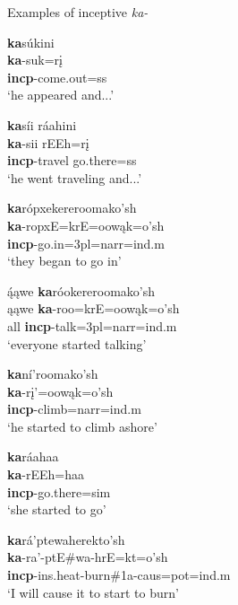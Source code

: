 \begin{exe}
\item\label{inceptiveexamples} Examples of inceptive \textit{ka-}

	\begin{xlist}
	
	\item \glll \textbf{ka}súkini\\
	\textbf{ka}-suk=rį\\
	\textbf{incp}-\textnormal{come.out}=ss\\
	\glt `he appeared and...' \citep[45]{hollow1973a}
	
	\item \glll \textbf{ka}síi ráahini\\
	\textbf{ka}-sii rEEh=rį\\
	\textbf{incp}-\textnormal{travel} \textnormal{go.there}=ss\\
	\glt `he went traveling and...' \citep[1]{hollow1973a}
	
	\item \glll \textbf{ka}rópxekereroomako'sh\\
	\textbf{ka}-ropxE=krE=oowąk=o'sh\\
	\textbf{incp}-\textnormal{go.in}=3pl=narr=ind.m\\
	\glt `they began to go in' \citep[174]{hollow1973b}
	
	\item \glll ą́ąwe \textbf{ka}róokereroomako'sh\\
	ąąwe \textbf{ka}-roo=krE=oowąk=o'sh\\
	\textnormal{all} \textbf{incp}-\textnormal{talk}=3pl=narr=ind.m\\
	\glt `everyone started talking' \citep[149]{hollow1973b}
	
	\item \glll \textbf{ka}ní'roomako'sh\\
	\textbf{ka}-rį'=oowąk=o'sh\\
	\textbf{incp}-\textnormal{climb}=narr=ind.m\\
	\glt `he started to climb ashore' \citep[270]{hollow1973b}
	
	\item \glll \textbf{ka}ráahaa\\
	\textbf{ka}-rEEh=haa\\
	\textbf{incp}-\textnormal{go.there}=sim\\
	\glt `she started to go' \citep[275]{hollow1973b}
	
	\item \glll \textbf{ka}rá'ptewaherekto'sh\\
	\textbf{ka}-ra'-ptE\#wa-hrE=kt=o'sh\\
	\textbf{incp}-ins.heat-\textnormal{burn}\#1a-caus=pot=ind.m\\
	\glt 	`I will cause it to start to burn' \citep[47]{hollow1973b}
	\end{xlist}


\end{exe}
